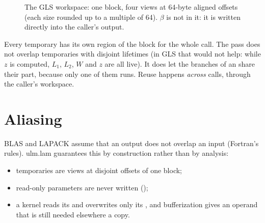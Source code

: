 \begin{figure}[h]
\centering
{}
\caption{The GLS workspace: one block, four views at 64-byte aligned
offsets (each size rounded up to a multiple of 64). \(\beta\) is not in it:
it is written directly into the caller's output.}
\label{fig:workspace}
\end{figure}

Every temporary has its own region of the block for the whole call. The
pass does not overlap temporaries with disjoint lifetimes (in GLS that
would not help: while \(z\) is computed, \(L_1\), \(L_2\), \(W\) and
\(z\) are all live). It does let the branches of an  share
their part, because only one of them runs. Reuse happens \emph{across}
calls, through the caller's workspace.

\section{Aliasing}
\label{sec:storage-alias}

BLAS and LAPACK assume that an output does not overlap an input (Fortran's
rules). ulm.lam guarantees this by construction rather than by analysis:
\begin{itemize}
\item temporaries are views at disjoint offsets of one block;
\item read-only parameters are never written ();
\item a kernel reads its  and overwrites only its , and
  bufferization gives an  operand that is still needed elsewhere
  a copy.
\end{itemize}

